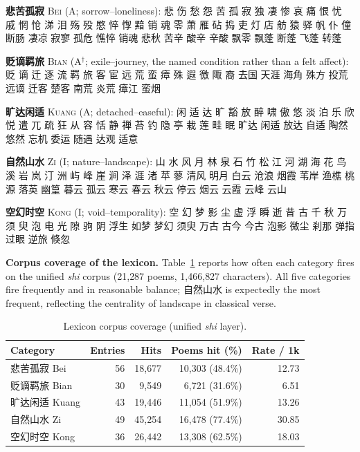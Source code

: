 \documentclass[11pt]{article}
\begin{document}
\smallskip
\noindent\textbf{悲苦孤寂} \textsc{Bei} (A; sorrow--loneliness):
悲 伤 愁 怨 苦 孤 寂 独 凄 惨 哀 痛 恨 忧 戚 惘 怆 涕 泪 殇 殁 愍 悴 惸 黯 销 魂 零 萧 雁 砧 捣 吏 灯 店 舫 猿 驿 帆 仆 僮
断肠 凄凉 寂寥 孤危 憔悴 销魂 悲秋 苦辛 酸辛 辛酸 飘零 飘蓬 断蓬 飞蓬 转蓬

\smallskip
\noindent\textbf{贬谪羁旅} \textsc{Bian} (A$^\dagger$; exile--journey, the named condition rather than a felt affect):
贬 谪 迁 逐 流 羁 旅 客 宦 远 荒 蛮 瘴 殊 遐 徼 陬 裔
去国 天涯 海角 殊方 投荒 远谪 迁客 楚客 南荒 炎荒 瘴江 蛮烟

\smallskip
\noindent\textbf{旷达闲适} \textsc{Kuang} (A; detached--easeful):
闲 适 达 旷 豁 放 醉 啸 傲 悠 淡 泊 乐 欣 悦 遣 兀 疏 狂 从 容 恬 静 禅 苔 钓 隐 亭 栽 莲 畦 眠
旷达 闲适 放达 自适 陶然 悠然 忘机 委运 随遇 达观 适意

\smallskip
\noindent\textbf{自然山水} \textsc{Zi} (I; nature--landscape):
山 水 风 月 林 泉 石 竹 松 江 河 湖 海 花 鸟 溪 岩 岚 汀 洲 屿 峰 崖 涧 泽 涯 渚 苹 蓼
清风 明月 白云 沧浪 烟霞 苇岸 渔樵 桃源 落英 幽篁 暮云 孤云 寒云 春云 秋云 停云 烟云 云霞 云峰 云山

\smallskip
\noindent\textbf{空幻时空} \textsc{Kong} (I; void--temporality):
空 幻 梦 影 尘 虚 浮 瞬 逝 昔 古 千 秋 万 须 臾 泡 电 光 隙 驹 阴
浮生 如梦 梦幻 须臾 万古 古今 今古 泡影 微尘 刹那 弹指 过眼 逆旅 倏忽

\smallskip
\noindent\textbf{Corpus coverage of the lexicon.}
Table~\ref{tab:lexfreq} reports how often each category fires on the unified
\emph{shi} corpus (21{,}287 poems, 1{,}466{,}827 characters). All five categories
fire frequently and in reasonable balance; 自然山水 is expectedly the most
frequent, reflecting the centrality of
landscape in classical verse.

\begin{table}[H]
\centering\footnotesize
\caption{Lexicon corpus coverage (unified \emph{shi} layer).}
\label{tab:lexfreq}
\begin{tabular}{lrrrr}
\toprule
Category & Entries & Hits & Poems hit (\%) & Rate / 1k\\
\midrule
悲苦孤寂 Bei & 56 & 18,677 & 10,303 (48.4\%) & 12.73\\
贬谪羁旅 Bian & 30 & 9,549 & 6,721 (31.6\%) & 6.51\\
旷达闲适 Kuang & 43 & 19,446 & 11,054 (51.9\%) & 13.26\\
自然山水 Zi & 49 & 45,254 & 16,478 (77.4\%) & 30.85\\
空幻时空 Kong & 36 & 26,442 & 13,308 (62.5\%) & 18.03\\
\bottomrule
\end{tabular}
\end{table}
\end{document}
